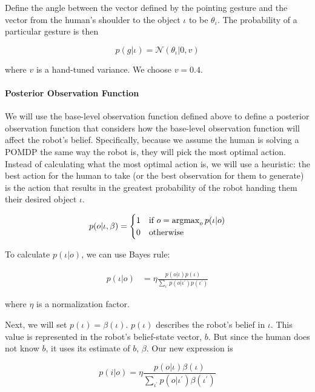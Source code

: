 \documentclass[conference]{IEEEtran}
\newcommand{\argmax}{\operatornamewithlimits{argmax}}
\begin{document}
Define the angle between the vector defined by the pointing gesture and the vector from the human's shoulder to the object $\iota$ to be $\theta_\iota$. The probability of a particular gesture is then

\begin{equation*}
p(g|\iota) = \mathcal{N}(\theta_\iota | 0, v)
\end{equation*}

where $v$ is a hand-tuned variance. We choose $v = 0.4$. 

\paragraph{Posterior Observation Function}

We will use the base-level observation function defined above to define a posterior observation function that considers how the base-level observation function will affect the robot's belief. Specifically, because we assume the human is solving a POMDP the same way the robot is, they will pick the most optimal action. Instead of calculating what the most optimal action is, we will use a heuristic: the best action for the human to take (or the best observation for them to generate) is the action that results in the greatest probability of the robot handing them their desired object $\iota$. 

\begin{equation*} 
	p(o | \iota, \beta) = \begin{cases}
		1 & \text{if } o = \argmax_o p(\iota|o) \\
		0 & \text{otherwise}
	\end{cases}
\end{equation*}

To calculate $p(\iota|o)$, we can use Bayes rule: 

\begin{align*}
p(\iota|o) &= \eta \frac{p(o|\iota) p(\iota)}{\sum_{\iota^\prime} p(o|\iota^\prime)p(\iota^\prime)} 
\end{align*}

where $\eta$ is a normalization factor. 

Next, we will set $p(\iota) = \beta(\iota)$. $p(\iota)$ describes the robot's belief in $\iota$. This value is represented in the robot's belief-state vector, $b$. But since the human does not know $b$, it uses its estimate of $b$, $\beta$. Our new expression is 

$$p(i|o) = \eta \frac{p(o|\iota) \beta(\iota)}{\sum_{\iota^\prime} p(o|\iota^\prime)\beta(\iota^\prime)} $$
\end{document}
